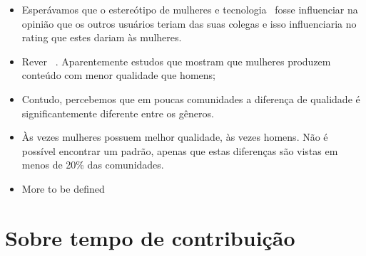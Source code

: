 \begin{itemize}
	\item Esperávamos que o estereótipo de mulheres e tecnologia~\cite{hyde1990gender} fosse influenciar na opinião que os outros usuários teriam das suas colegas e isso influenciaria no rating que estes dariam às mulheres.
	\item Rever ~\cite{campbell1986effects}\cite{collier2012conflict}. Aparentemente estudos que mostram que mulheres produzem conteúdo com menor qualidade que homens;
	\item Contudo, percebemos que em poucas comunidades a diferença de qualidade é significantemente diferente entre os gêneros.
	\item Às vezes mulheres possuem melhor qualidade, às vezes homens. Não é possível encontrar um padrão, apenas que estas diferenças são vistas em menos de 20\% das comunidades.
	\item More to be defined
\end{itemize}


\section{Sobre tempo de contribuição}

